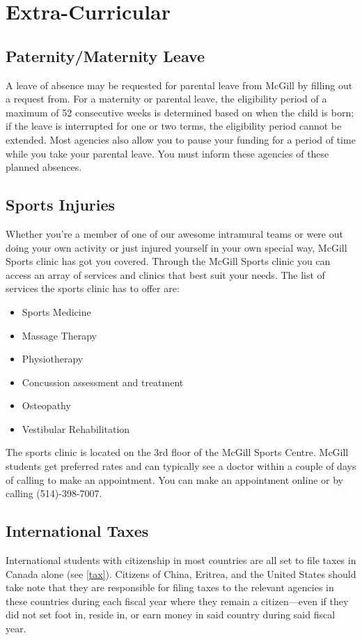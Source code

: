 \section{Extra-Curricular}

    \subsection{Paternity/Maternity Leave} 
        A leave of absence may be requested for parental leave from McGill by filling out a request from. For a maternity or parental leave, the eligibility period of a maximum of 52 consecutive weeks is determined based on when the child is born; if the leave is interrupted for one or two terms, the eligibility period cannot be extended. Most agencies also allow you to pause your funding for a period of time while you take your parental leave. You must inform these agencies of these planned absences.


    \subsection{Sports Injuries}
        Whether you're a member of one of our awesome intramural teams or were out doing your own activity or just injured yourself in your own special way, McGill Sports clinic has got you covered. Through the McGill Sports clinic you can access an array of services and clinics that best suit your needs. The list of services the sports clinic has to offer are: 
        \begin{itemize}
            \item Sports Medicine
            \item Massage Therapy
            \item Physiotherapy
            \item Concussion assessment and treatment
            \item Osteopathy
            \item Vestibular Rehabilitation
        \end{itemize}
        The sports clinic is located on the 3rd floor of the McGill Sports Centre. McGill students get preferred rates and can typically see a doctor within a couple of days of calling to make an appointment. You can make an appointment online or by calling (514)-398-7007.

    \subsection{International Taxes} 
        International students with citizenship in most countries are all set to file taxes in Canada alone (see 
        \hyperref[tax]{\textcolor{purble}{\ref*{tax}}}). Citizens of China, Eritrea, and the United States should take note that they are responsible for filing taxes to the relevant agencies in these countries during each fiscal year where they remain a citizen---even if they did not set foot in, reside in, or earn money in said country during said fiscal year.

